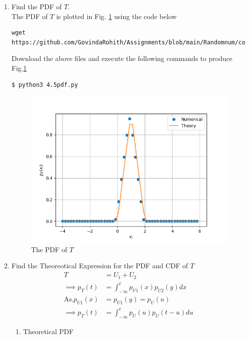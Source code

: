 \documentclass[journal,12pt,twocolumn]{IEEEtran}
\renewcommand\thesection{\arabic{section}}
\begin{document}
\begin{enumerate}[label=\thesection.\arabic*
,ref=\thesection.\theenumi]
\begin{figure}[!h]
\caption{The CDF of $T$}
\label{fig:4.2}
\end{figure}
\item Find the PDF of $T$.\\
\solution The PDF of $T$ is plotted in Fig. \ref{fig:4.2} using the code below
\begin{lstlisting}
wget https://github.com/GovindaRohith/Assignments/blob/main/Randomnum/codes/4.5pdf.py
\end{lstlisting}
Download the above files and execute the following commands to produce Fig.\ref{fig:4.2}
\begin{lstlisting}
$ python3 4.5pdf.py
\end{lstlisting}
\begin{figure}[!h]
\centering
\includegraphics[width=\columnwidth]{./figs/4.5pdf.png}
\caption{The PDF of $T$}
\label{fig:4.3}
\end{figure}
\item Find the Theoreotical Expression for the PDF and CDF of $T$\\
\solution
\begin{align}
    T&=U_1+U_2\\
    \implies p_T(t)&=\int_{-\infty}^{t}p_{U1}(x)p_{U2}(y)dx\\
    \text{As,}p_{U1}(x)&=p_{U1}(y)=p_{U}(u)\\
    \implies p_T(t)&=\int_{-\infty}^{t}p_{U}(u)p_{U}(t-u)du
    \end{align}
    \begin{enumerate}
        \item Theoretical PDF 
        \begin{enumerate}

\end{enumerate}
\end{enumerate}
\end{enumerate}
\end{document}
